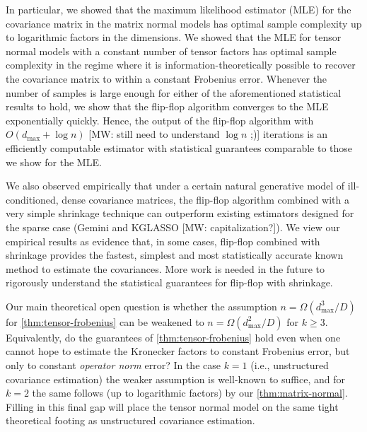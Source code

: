 \documentclass[aos]{imsart}
\theoremstyle{definition}
\numberwithin{equation}{section}
\def\dmax{d_{\max}}
\newcommand{\MW}[1]{{\color{red}[MW: #1]}}
\newcommand{\MW}[1]{{}}
\begin{document}
In particular, we showed that the maximum likelihood estimator (MLE) for the covariance matrix in the matrix normal models has optimal sample complexity up to logarithmic factors in the dimensions.
We showed that the MLE for tensor normal models with a constant number of tensor factors has optimal sample complexity in the regime where it is information-theoretically possible to recover the covariance matrix to within a constant Frobenius error.
Whenever the number of samples is large enough for either of the aforementioned statistical results to hold, we show that the flip-flop algorithm converges to the MLE exponentially quickly.
Hence, the output of the flip-flop algorithm with $O\left(\dmax +  \log n \right)$ \MW{still need to understand $\log n$ ;)} iterations is an efficiently computable estimator with statistical guarantees comparable to those we show for the MLE.

We also observed empirically that under a certain natural generative model of ill-conditioned, dense covariance matrices, the flip-flop algorithm combined with a very simple shrinkage technique can outperform existing estimators designed for the sparse case (Gemini and KGLASSO \MW{capitalization?}).
We view our empirical results as evidence that, in some cases, flip-flop combined with shrinkage provides the fastest, simplest and most statistically accurate known method to estimate the covariances.
More work is needed in the future to rigorously understand the statistical guarantees for flip-flop with shrinkage.


Our main theoretical open question is whether the assumption $n = \Omega( \dmax^3/ D)$ for \cref{thm:tensor-frobenius} can be weakened to $n = \Omega( \dmax^2/ D)$ for $k \geq 3$.
Equivalently, do the guarantees of \cref{thm:tensor-frobenius} hold even when one cannot hope to estimate the Kronecker factors to constant Frobenius error, but only to constant \emph{operator norm} error?
In the case $k = 1$ (i.e., unstructured covariance estimation) the weaker assumption is well-known to suffice, and for $k = 2$ the same follows (up to logarithmic factors) by our \cref{thm:matrix-normal}.
Filling in this final gap will place the tensor normal model on the same tight theoretical footing as unstructured covariance estimation.
\end{document}
